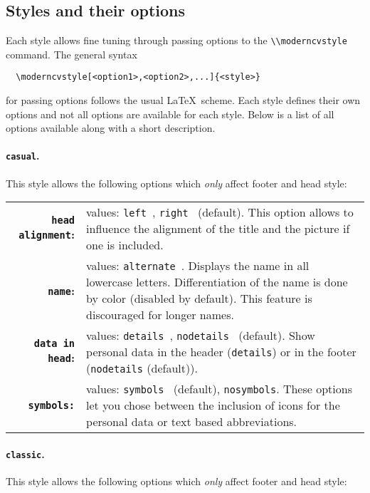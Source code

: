 \documentclass[a4paper,11pt]{article}
\newcommand{\code}[1]{\lstinline!#1!}
\newcommand{\Code}[1]{\lstinline!#1!~} %
\begin{document}
\subsection{Styles and their options}
\label{section:customization:stylesAndOptions}
Each style allows fine tuning through passing options to the \Code{\\moderncvstyle} command. The general syntax
\begin{lstlisting}
  \moderncvstyle[<option1>,<option2>,...]{<style>}
\end{lstlisting}
for passing options follows the usual \LaTeX\ scheme.
Each style defines their own options and not all options are available for each style. 
Below is a list of all options available along with a short description. 

\paragraph{\texttt{casual}.} This style allows the following options which \emph{only} affect footer and head style:\medskip

\begingroup
\renewcommand{\arraystretch}{1.1}
\begin{tabular}{r@{\hspace{2ex}}p{}}
 {\bfseries \code{head alignment}:}  & values: \Code{left}, \Code{right} (default). This option allows to influence the alignment of the title and the picture if one is included.  \\
 {\bfseries \texttt{name}:} & values: \Code{alternate}. Displays the name in all lowercase letters. Differentiation of the name is done by color (disabled by default). This feature is discouraged for  longer names.\\
 {\bfseries \code{data in head}:} & values: \Code{details}, \Code{nodetails} (default). Show personal data in the header (\code{details}) or in the footer (\code{nodetails} (default)). \\
 {\bfseries \code{symbols:}}   & values: \Code{symbols} (default), \code{nosymbols}. These options let you chose between the inclusion of icons for the personal data or text based abbreviations. 
\end{tabular}\medskip
\endgroup

\paragraph{\texttt{classic}.} This style allows the following options which \emph{only} affect footer and head style:\medskip
\end{document}
